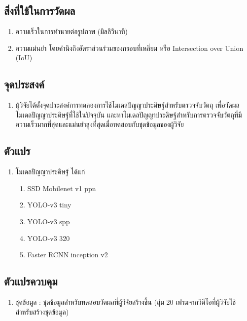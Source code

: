 \subsection*{สิ่งที่ใช้ในการวัดผล}
	\begin{enumerate}
		\item ความเร็วในการทำนายต่อรูปภาพ (มิลลิวินาที)
		\item ความแม่นยำ โดยคำนึงถึงอัตราส่วนร่วมของกรอบที่เหลี่ยม หรือ Intersection over Union (IoU)
	\end{enumerate}
\subsection*{จุดประสงค์}
	\begin{enumerate}
		\item ผู้วิจัยได้ตั้งจุดประสงค์การทดลองการใช้โมเดลปัญญาประดิษฐ์สำหรับตรวจจับวัตถุ เพื่อวัดผลโมเดลปัญญาประดิษฐ์ที่ใช้ในปัจจุบัน
และหาโมเดลปัญญาประดิษฐ์สำหรับการตรวจจับวัตถุที่มีความเร็วมากที่สุดและแม่นยำสูงที่สุดเมื่อทดสอบกับชุดข้อมูลของผู้วิจัย
	\end{enumerate}
\subsection*{ตัวแปร}
	\begin{enumerate}
		\item โมเดลปัญญาประดิษฐ์ ได้แก่
		\begin{enumerate}
			\item SSD Mobilenet v1 ppn
			\item YOLO-v3 tiny
			\item YOLO-v3 spp	
			\item YOLO-v3 320
			\item Faster RCNN inception v2
		\end{enumerate}
	\end{enumerate}
\subsection*{ตัวแปรควบคุม}
	\begin{enumerate}
		\item ชุดข้อมูล : ชุดข้อมูลสำหรับทดสอบวัดผลที่ผู้วิจัยสร้างขึ้น (สุ่ม 20 เฟรมจากวิดีโอที่ผู้วิจัยใช้สำหรับสร้างชุดข้อมูล)
	\end{enumerate}
